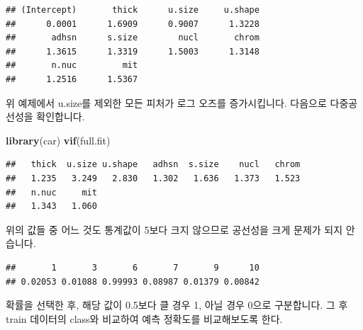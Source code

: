 \documentclass[12pt,]{book}
\newenvironment{Shaded}{\begin{snugshade}}{\end{snugshade}}
\newcommand{\DecValTok}[1]{\textcolor[rgb]{0.00,0.00,0.81}{#1}}
\newcommand{\KeywordTok}[1]{\textcolor[rgb]{0.13,0.29,0.53}{\textbf{#1}}}
\newcommand{\NormalTok}[1]{#1}
\newcommand{\OperatorTok}[1]{\textcolor[rgb]{0.81,0.36,0.00}{\textbf{#1}}}
\newcommand{\StringTok}[1]{\textcolor[rgb]{0.31,0.60,0.02}{#1}}
\begin{document}
\begin{Shaded}
\end{Shaded}

\begin{verbatim}
## (Intercept)       thick      u.size     u.shape 
##      0.0001      1.6909      0.9007      1.3228 
##       adhsn      s.size        nucl       chrom 
##      1.3615      1.3319      1.5003      1.3148 
##       n.nuc         mit 
##      1.2516      1.5367
\end{verbatim}

위 예제에서 u.size를 제외한 모든 피처가 로그 오즈를 증가시킵니다. 다음으로 다중공선성을 확인합니다.

\begin{Shaded}
\begin{Highlighting}[]
\KeywordTok{library}\NormalTok{(car)}
\KeywordTok{vif}\NormalTok{(full.fit)}
\end{Highlighting}
\end{Shaded}

\begin{verbatim}
##   thick  u.size u.shape   adhsn  s.size    nucl   chrom 
##   1.235   3.249   2.830   1.302   1.636   1.373   1.523 
##   n.nuc     mit 
##   1.343   1.060
\end{verbatim}

위의 값들 중 어느 것도 통계값이 5보다 크지 않으므로 공선성을 크게 문제가 되지 안습니다.

\begin{Shaded}
\end{Shaded}

\begin{verbatim}
##       1       3       6       7       9      10 
## 0.02053 0.01088 0.99993 0.08987 0.01379 0.00842
\end{verbatim}

확률을 선택한 후, 해당 값이 0.5보다 클 경우 1, 아닐 경우 0으로 구분합니다. 그 후 train 데이터의 class와 비교하여 예측 정확도를 비교해보도록 한다.
\end{document}
